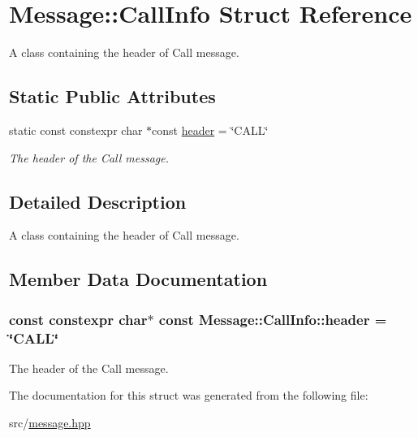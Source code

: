 \hypertarget{struct_message_1_1_call_info}{}\section{Message\+:\+:Call\+Info Struct Reference}
\label{struct_message_1_1_call_info}


A class containing the header of Call message.  


\subsection*{Static Public Attributes}
\begin{DoxyCompactItemize}
\item 
static const constexpr char $\ast$const \hyperlink{struct_message_1_1_call_info_a8abd3d3a05a677da712bef3ad8bd99dd}{header} = \char`\"{}C\+A\+LL\char`\"{}
\begin{DoxyCompactList}\small\item\em The header of the Call message. \end{DoxyCompactList}\end{DoxyCompactItemize}


\subsection{Detailed Description}
A class containing the header of Call message. 

\subsection{Member Data Documentation}
\subsubsection[{\texorpdfstring{header}{header}}]{\setlength{\rightskip}{0pt plus 5cm}const constexpr char$\ast$ const Message\+::\+Call\+Info\+::header = \char`\"{}C\+A\+LL\char`\"{}\hspace{0.3cm}{\ttfamily [static]}}\hypertarget{struct_message_1_1_call_info_a8abd3d3a05a677da712bef3ad8bd99dd}{}\label{struct_message_1_1_call_info_a8abd3d3a05a677da712bef3ad8bd99dd}


The header of the Call message. 



The documentation for this struct was generated from the following file\+:\begin{DoxyCompactItemize}
\item 
src/\hyperlink{message_8hpp}{message.\+hpp}\end{DoxyCompactItemize}
